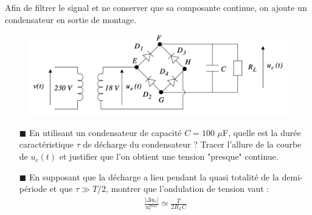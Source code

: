 \documentclass{report}
\begin{document}
Afin de filtrer le signal et ne conserver que sa composante continue, on ajoute un condensateur en sortie de montage.

\begin{figure}[h!]
	\centering
		\includegraphics[scale=0.7]{circuit2_2.png}
\end{figure}	

\begin{itemize}

	\item[$\blacksquare$] En utilisant un condensateur de capacité $C=100$ $\mu$F, quelle est la durée caractéristique $\tau$ de décharge du condensateur ? Tracer l'allure de la courbe de $u_c(t)$ et justifier que l'on obtient une tension "presque" continue.


	\item[$\blacksquare$] En supposant que la décharge a lieu pendant la quasi totalité de la demi-période et que $\tau\gg T/2$, montrer que l'ondulation de tension vaut : 
	\begin{align*}
		\frac{|\Delta u_c|}{u_c^{max}}\simeq \frac{T}{2R_LC}
	\end{align*}

\end{itemize}
\end{document}
